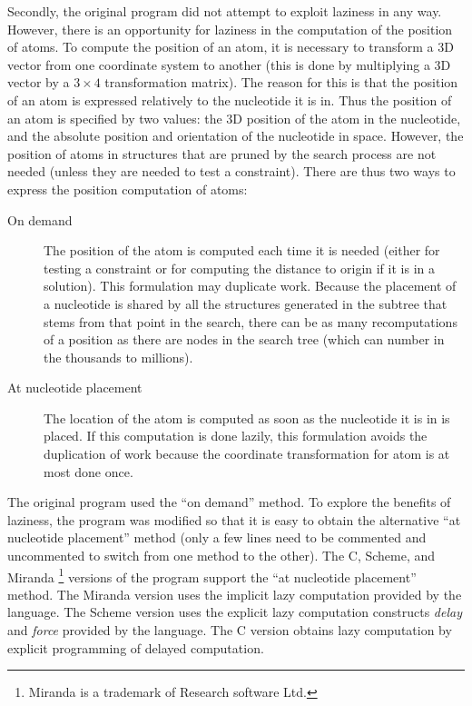 Secondly, the original program did not attempt to exploit laziness in
any way. However, there is an opportunity for laziness in the
computation of the position of atoms. To compute the position of an
atom, it is necessary to transform a 3D vector from one coordinate
system to another (this is done by multiplying a 3D vector by a $3
\times 4$ transformation matrix). The reason for this is that the
position of an atom is expressed relatively to the nucleotide it is
in. Thus the position of an atom is specified by two values: the 3D
position of the atom in the nucleotide, and the absolute position and
orientation of the nucleotide in space. However, the position of atoms
in structures that are pruned by the search process are not needed
(unless they are needed to test a constraint). There are thus two ways
to express the position computation of atoms:
\begin{description}
\item[On demand]
The position of the atom is computed each time it is needed (either for
testing a constraint or for computing the distance to origin if it is
in a solution). This formulation may duplicate work. Because the
placement of a nucleotide is shared by all the structures generated in
the subtree that stems from that point in the search, there can be as
many recomputations of a position as there are nodes in the search tree
(which can number in the thousands to millions).
\item[At nucleotide placement]
The location of the atom is computed as soon as the nucleotide it is in
is placed. If this computation is done lazily, this formulation avoids
the duplication of work because the coordinate transformation for atom
is at most done once.
\end{description}
The original program used the ``on demand'' method. To explore the
benefits of laziness, the program was modified so that it is easy to
obtain the alternative ``at nucleotide placement'' method (only a few
lines need to be commented and uncommented to switch from one method to
the other). The C, Scheme, and Miranda \footnote{Miranda is a trademark
of Research software Ltd.} versions of the program support the ``at
nucleotide placement'' method. The Miranda version uses the implicit
lazy computation provided by the language. The Scheme version uses the
explicit lazy computation constructs {\em delay} and {\em force}
provided by the language. The C version obtains lazy computation by
explicit programming of delayed computation.

